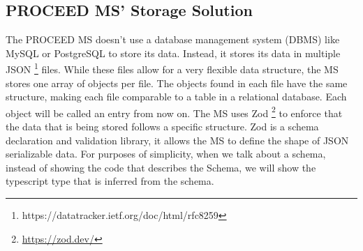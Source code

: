 %
%
%
%

\subsection{PROCEED MS' Storage Solution}
\label{cha:relatedwork:proceed-storage}

The PROCEED MS doesn't use a database management system (DBMS) like MySQL or PostgreSQL to store its data.
Instead, it stores its data in multiple
JSON \footnote{https://datatracker.ietf.org/doc/html/rfc8259} files.
While these files allow for a very flexible data structure, the MS stores one array of
objects per file.
The objects found in each file have the same structure, 
making each file comparable to a table in a relational database.
Each object will be called an entry from now on.
The MS uses Zod \footnote{\url{https://zod.dev/}} to enforce that the data that is being
stored follows a specific structure. 
Zod is a schema declaration and validation library, it allows the MS to define the shape
of JSON serializable data.
For purposes of simplicity, when we talk about a schema, instead of showing the code that
describes the Schema, we will show the typescript type that is inferred from the schema.

